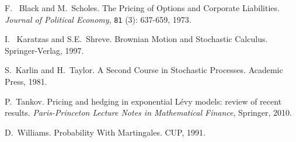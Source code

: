 \documentclass[a4paper]{article}
\theoremstyle{definition}
\numberwithin{equation}{section}
\begin{document}
\begin{thebibliography}{9}
F.~ Black and M.~Scholes.
The Pricing of Options and Corporate Liabilities.
\textit{Journal of Political Economy}, {\tt 81} (3): 637-659, 1973.

I.~ Karatzas and S.E.~Shreve.
Brownian Motion and Stochastic Calculus.
Springer-Verlag, 1997.

S.~Karlin and H.~Taylor.
A Second Course in Stochastic Processes. 
Academic Press, 1981.

 P.~Tankov.
Pricing and hedging in exponential L\'evy models: review of recent results. 
\textit{Paris-Princeton Lecture Notes in Mathematical Finance}, Springer, 2010. 

D.~Williams.
Probability With Martingales.
CUP, 1991.

\end{thebibliography}
\end{document}
